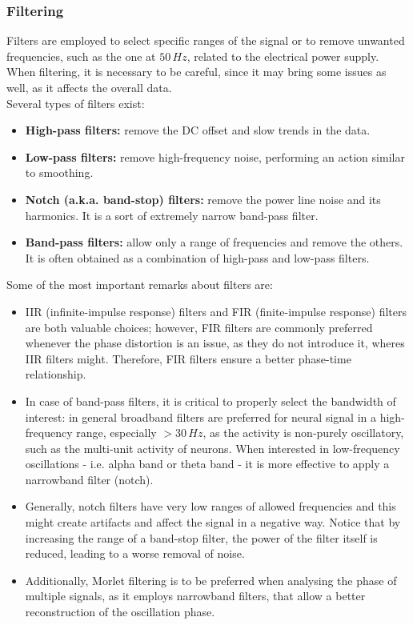\subsubsection{Filtering}
Filters are employed to select specific ranges of the signal or to remove unwanted frequencies,
such as the one at \(50\,Hz\), related to the electrical power supply. When filtering, it is
necessary to be careful, since it may bring some issues as well, as it affects the overall
data.\\
Several types of filters exist:
\begin{itemize}
    \item \textbf{High-pass filters:} remove the DC offset and slow trends in the data.
    \item \textbf{Low-pass filters:} remove high-frequency noise, performing an action
          similar to smoothing.
    \item \textbf{Notch (a.k.a. band-stop) filters:} remove the power line noise and its harmonics.
          It is a sort of extremely narrow band-pass filter.
    \item \textbf{Band-pass filters:} allow only a range of frequencies and remove the others.
          It is often obtained as a combination of high-pass and low-pass filters.
\end{itemize}
Some of the most important remarks about filters are:
\begin{itemize}
    \item IIR (infinite-impulse response) filters and FIR (finite-impulse response)
          filters are both valuable choices; however, FIR filters are commonly preferred
          whenever the phase distortion is an issue, as they do not introduce it, wheres
          IIR filters might. Therefore, FIR filters ensure a better phase-time relationship.
    \item In case of band-pass filters, it is critical to properly select the
          bandwidth of interest: in general broadband filters are preferred for neural
          signal in a high-frequency range, especially \(>30\,Hz\), as the activity
          is non-purely oscillatory, such as the multi-unit activity of neurons. When
          interested in low-frequency oscillations - i.e. alpha band or theta band - it is
          more effective to apply a narrowband filter (notch).
    \item Generally, notch filters have very low ranges of allowed frequencies and
          this might create artifacts and affect the signal in a negative way. Notice
          that by increasing the range of a band-stop filter, the power of the filter itself
          is reduced, leading to a worse removal of noise.
    \item Additionally, Morlet filtering is to be preferred when analysing the phase
          of multiple signals, as it employs narrowband filters, that allow a better reconstruction
          of the oscillation phase.
\end{itemize}
